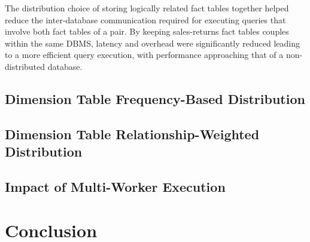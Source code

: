 \documentclass[conference]{IEEEtran}
\begin{document}
The distribution choice of storing logically related fact tables together helped reduce the inter-database communication required for executing queries that involve both fact tables of a pair. By keeping sales-returns fact tables couples within the same DBMS, latency and overhead were significantly reduced leading to a more efficient query execution, with performance approaching that of a non-distributed database.


\subsection{Dimension Table Frequency-Based Distribution}

\subsection{Dimension Table Relationship-Weighted Distribution}

\subsection{Impact of Multi-Worker Execution}

\section{Conclusion}
\end{document}

